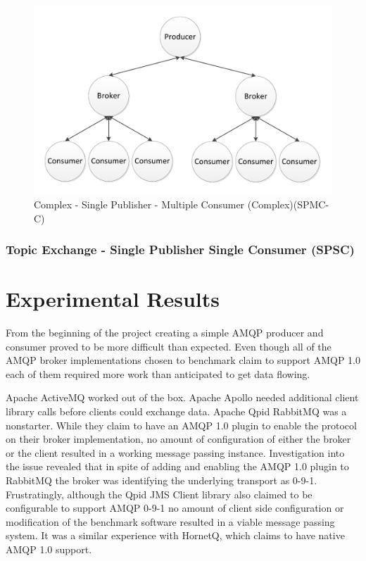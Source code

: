 \documentclass{thesis}
\begin{document}
\begin{figure}
\centering
\vspace{2.0in} 
\includegraphics{complicated_fanout}  
\caption{Complex - Single Publisher - Multiple Consumer (Complex)(SPMC-C)}
\label{Figure 4}  
\end{figure}

\subsection{Topic Exchange - Single Publisher Single Consumer (SPSC)}


\chapter{Experimental Results}

From the beginning of the project creating a simple AMQP producer and consumer proved to be more difficult than expected.  Even though all of the AMQP broker implementations chosen to benchmark claim to support AMQP 1.0 each of them required more work than anticipated to get data flowing.  

Apache ActiveMQ worked out of the box.  
Apache Apollo needed additional client library calls before clients could exchange data.
Apache Qpid 
RabbitMQ was a nonstarter.  While they claim to have an AMQP 1.0 plugin to enable the protocol on their broker implementation, no amount of configuration of either the broker or the client resulted in a working message passing instance.  Investigation into the issue revealed that in spite of adding and enabling the AMQP 1.0 plugin to RabbitMQ the broker was identifying the underlying transport as 0-9-1.  Frustratingly, although the Qpid JMS Client library also claimed to be configurable to support AMQP 0-9-1 no amount of client side configuration or modification of the benchmark software resulted in a viable message passing system.
It was a similar experience with HornetQ, which claims to have native AMQP 1.0 support. 
\end{document}
